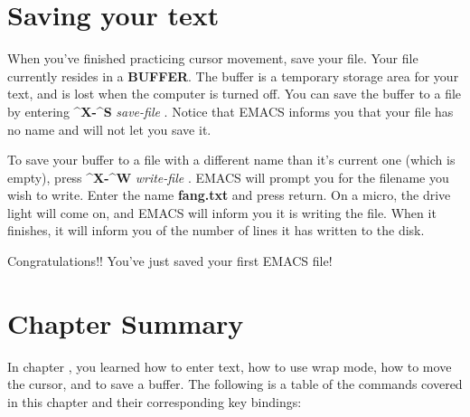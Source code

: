 \section{Saving your text}

When you've finished practicing cursor movement, save your file.  Your
 file currently resides in a {\bf{}BUFFER}.  The buffer
is a temporary storage area for your text, and is lost when the
computer is turned off.  You can save the buffer to a file by entering
{\bf{}\^{}X-\^{}S} {\it{}save-file} .  Notice that
EMACS informs you that your file has no name and will not let you save
it.

To save your buffer to a file with a different name than it's current
one (which is empty), press {\bf{}\^{}X-\^{}W} {\it{}write-file}
.  EMACS will prompt you for the filename you wish
to write.  Enter the name {\bf{}fang.txt} and press return.  On a
micro, the drive light will come on, and EMACS will inform you it is
writing the file.  When it finishes, it will inform you of the number
of lines it has written to the disk.

Congratulations!! You've just saved your first EMACS file!
\section{Chapter \thechapter{} Summary}

In chapter \thechapter{}, you learned how to enter text, how
to use wrap mode, how to move the cursor, and to save a buffer.  The
following is a table of the commands covered in this chapter and their
corresponding key bindings:

